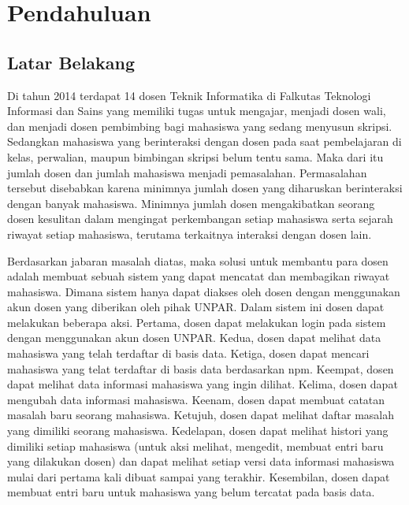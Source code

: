 \chapter{Pendahuluan}
\label{chap:pendahuluan}

\section{Latar Belakang}
\label{sec:latarbelakang}

Di tahun 2014 terdapat 14 dosen Teknik Informatika di Falkutas Teknologi Informasi dan Sains \cite{Ftis:2014} yang memiliki tugas untuk mengajar, menjadi dosen wali, dan menjadi dosen pembimbing bagi mahasiswa yang sedang menyusun skripsi. Sedangkan mahasiswa yang berinteraksi dengan dosen pada saat pembelajaran di kelas, perwalian, maupun bimbingan skripsi belum tentu sama. Maka dari itu jumlah dosen dan jumlah mahasiswa menjadi pemasalahan. Permasalahan tersebut disebabkan karena minimnya jumlah dosen yang diharuskan berinteraksi dengan banyak mahasiswa. Minimnya jumlah dosen mengakibatkan seorang dosen kesulitan dalam mengingat perkembangan setiap mahasiswa serta sejarah riwayat setiap mahasiswa, terutama terkaitnya interaksi dengan dosen lain.

Berdasarkan jabaran masalah diatas, maka solusi untuk membantu para dosen adalah membuat sebuah sistem yang dapat mencatat dan membagikan riwayat mahasiswa. Dimana sistem hanya dapat diakses oleh dosen dengan menggunakan akun dosen yang diberikan oleh pihak UNPAR. Dalam sistem ini dosen dapat melakukan beberapa aksi. Pertama, dosen dapat melakukan login pada sistem dengan menggunakan akun dosen UNPAR. Kedua, dosen dapat melihat data mahasiswa yang telah terdaftar di basis data. Ketiga, dosen dapat mencari mahasiswa yang telat terdaftar di basis data berdasarkan npm. Keempat, dosen dapat melihat data informasi mahasiswa yang ingin dilihat. Kelima, dosen dapat mengubah data informasi mahasiswa. Keenam, dosen dapat membuat catatan masalah baru seorang mahasiswa. Ketujuh, dosen dapat melihat daftar masalah yang dimiliki seorang mahasiswa. Kedelapan, dosen dapat melihat histori yang dimiliki setiap mahasiswa (untuk aksi melihat, mengedit, membuat entri baru yang dilakukan dosen) dan dapat melihat setiap versi data informasi mahasiswa mulai dari pertama kali dibuat sampai yang terakhir. Kesembilan, dosen dapat membuat entri baru untuk mahasiswa yang belum tercatat pada basis data. 

